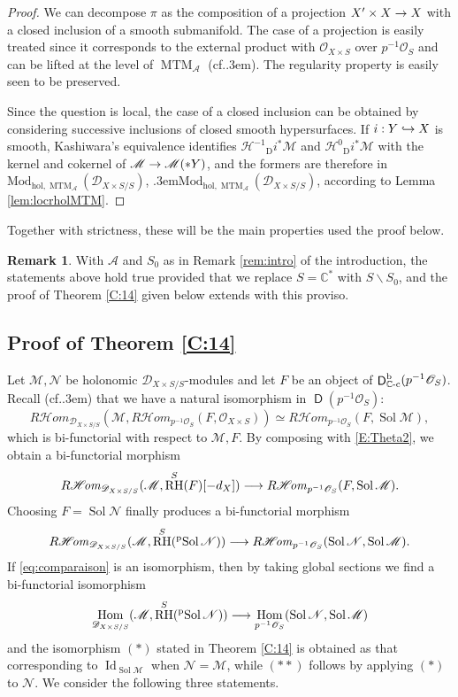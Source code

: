 \documentclass[english]{smfart}
\numberwithin{subsection}{section}
\def\sha{\mathcal{A}}\let\cA\sha
\def\shd{\mathcal{D}}\let\cD\shd
\def\shh{\mathcal{H}}
\def\shh{\mathcal{H}}
\def\shm{\mathcal{M}}
\def\shn{\mathcal{N}}\let\shn\shn
\def\sho{\mathcal{O}}\let\cO\sho
\newcommand{\C}{\mathbb{C}}\let\CC\C
\newcommand{\Rhom}{R\shhom}
\newcommand{\shhom}{\mathcal{H}\!\mathit{om}}\let\ho\shhom
\DeclareMathOperator{\RH}{RH}
\newcommand{\rb}{\mathrm{b}}
\newcommand{\hol}{\mathrm{hol}}
\newcommand{\Mod}{\mathrm{Mod}}
\newcommand{\cc}{{\C\textup{-c}}}
\newcommand{\XS}{X\times S}
\newcommand{\DXS}{\shd_{\XS/S}}
\DeclareMathOperator{\rD}{\mathsf{D}}
\DeclareMathOperator{\Hom}{Hom}
\DeclareMathOperator{\id}{Id}\let\Id\id
\DeclareMathOperator{\MTM}{MTM}
\DeclareMathOperator{\Sol}{Sol}
\DeclareMathOperator{\pSol}{{}^\mathrm{p}Sol}
\def\cf{cf.\kern.3em}
\def\resp{\text{resp.}\kern.3em}
\let\moins\smallsetminus
\newcommand{\Di}{{}_{\scriptscriptstyle\mathrm{D}}i}
\newcommand{\pOS}{p^{-1}\sho_S}
\numberwithin{equation}{section}
\theoremstyle{plain}
\theoremstyle{definition}
\newtheorem{remark}[equation]{Remark}
\def\to{\mathchoice{\longrightarrow}{\rightarrow}{\rightarrow}{\rightarrow}}
\def\hto{\mathrel{\lhook\joinrel\to}}
\begin{document}
\begin{proof}
We can decompose $\pi$ as the composition of a projection $X'\times X\to X$ with a closed inclusion of a smooth submanifold. The case of a projection is easily treated since it corresponds to the external product with $\sho_{\XS}$ over $\pOS$ and can be lifted at the level of $\MTM_\sha$ (\cf\cite[\S11.4.2]{Mochizuki11}). The regularity property is easily seen to be preserved.

Since the question is local, the case of a closed inclusion can be obtained by considering successive inclusions of closed smooth hypersurfaces. If $i:Y\hto X$ is smooth, Kashiwara's equivalence identifies $\shh^{-1}\Di^*\shm$ and $\shh^{0}\Di^*\shm$ with the kernel and cokernel of $\shm\to\shm(*Y)$, and the formers are therefore in $\Mod_{\hol,\MTM_\sha}(\DXS)$, \resp $\Mod_{\hol,\MTM_\sha}(\DXS)$, according to Lemma \ref{lem:locrholMTM}.
\end{proof}

Together with strictness, these will be the main properties used the proof below.

\begin{remark}\label{rem:proviso}
With $\sha$ and $S_0$ as in Remark \ref{rem:intro} of the introduction, the statements above hold true provided that we replace $S=\CC^*$ with $S\moins S_0$, and the proof of Theorem \ref{C:14} given below extends with this proviso.
\end{remark}


\subsection{Proof of Theorem \ref{C:14}}\label{subsec:C14}
Let $\shm,\shn$ be holonomic $\DXS$-modules and let $F$ be an object of $\rD^\rb_\cc(\pOS)$. Recall (\cf \cite[(2.6.7)]{K-S90}) that we have a natural isomorphism in $\rD(\pOS)$:
\[
\Rhom_{\cD_{\XS/S}}(\shm,\Rhom_{\pOS}(F,\cO_{\XS}))\simeq\Rhom_{\pOS}(F,\Sol\shm),
\]
which is bi-functorial with respect to $\shm,F$. By composing with \eqref{E:Theta2}, we obtain a bi-functorial morphism
\[
\Rhom_{\DXS}(\shm, \RH^S(F)[-d_X])\to\Rhom_{\pOS}(F,\Sol\shm).
\]
Choosing $F=\Sol\shn$ finally produces a bi-functorial morphism
\begin{equation}\label{eq:comparaison}
\Rhom_{\DXS}(\shm, \RH^S(\pSol\shn))\to\Rhom_{\pOS}(\Sol\shn,\Sol\shm).
\end{equation}
If \eqref{eq:comparaison} is an isomorphism, then by taking global sections we find a bi-functorial isomorphism
\[
\Hom_{\DXS}(\shm, \RH^S(\pSol\shn))\to\Hom_{\pOS}(\Sol\shn,\Sol\shm)
\]
and the isomorphism $(*)$ stated in Theorem \ref{C:14} is obtained as that corresponding to $\id_{\Sol\shm}$ when $\shn=\shm$, while $(**)$ follows by applying $(*)$ to $\shn$. We consider the following three statements.
\end{document}
